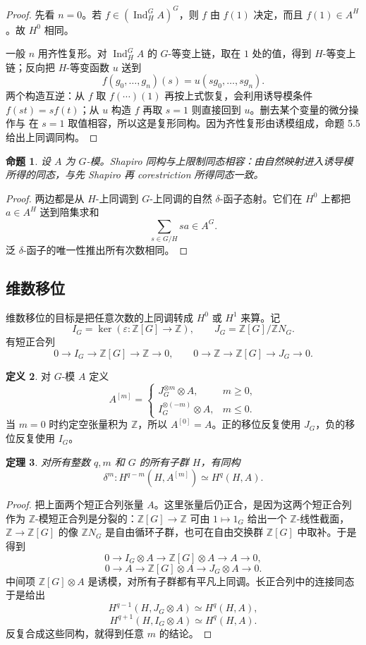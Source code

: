 \documentclass[11pt,a4paper,openany]{ctexbook}
\numberwithin{equation}{chapter}
\newcommand{\Z}{\mathbb{Z}}
\theoremstyle{plain}
\newtheorem{theorem}{定理}[chapter]
\newtheorem{proposition}[theorem]{命题}
\theoremstyle{definition}
\newtheorem{definition}[theorem]{定义}
\theoremstyle{remark}
\begin{document}
\begin{proof}
先看 $n=0$。若 $f\in(\operatorname{Ind}_H^G A)^G$，则 $f$ 由 $f(1)$ 决定，而且 $f(1)\in A^H$。故 $H^0$ 相同。

一般 $n$ 用齐性复形。对 $\operatorname{Ind}_H^G A$ 的 $G$-等变上链，取在 $1$ 处的值，得到 $H$-等变上链；反向把 $H$-等变函数 $u$ 送到
\[
 f(g_0,\ldots,g_n)(s)=u(sg_0,\ldots,sg_n).
\]
两个构造互逆：从 $f$ 取 $f(\cdots)(1)$ 再按上式恢复，会利用诱导模条件
$f(st)=sf(t)$；从 $u$ 构造 $f$ 再取 $s=1$ 则直接回到 $u$。删去某个变量的微分操作与
在 $s=1$ 取值相容，所以这是复形同构。因为齐性复形由诱模组成，命题 5.5 给出上同调同构。
\end{proof}

\begin{proposition}
设 $A$ 为 $G$-模。Shapiro 同构与上限制同态相容：由自然映射进入诱导模所得的同态，与先 Shapiro 再 corestriction 所得同态一致。
\end{proposition}

\begin{proof}
两边都是从 $H$-上同调到 $G$-上同调的自然 $\delta$-函子态射。它们在 $H^0$ 上都把 $a\in A^H$ 送到陪集求和
\[
 \sum_{s\in G/H}sa\in A^G.
\]
泛 $\delta$-函子的唯一性推出所有次数相同。
\end{proof}

\subsection{维数移位}

维数移位的目标是把任意次数的上同调转成 $H^0$ 或 $H^1$ 来算。记
\[
 I_G=\ker(\varepsilon:\Z[G]\to\Z),\qquad
 J_G=\Z[G]/\Z N_G.
\]
有短正合列
\[
 0\to I_G\to \Z[G]\to\Z\to0,
\qquad
 0\to\Z\to\Z[G]\to J_G\to0.
\]

\begin{definition}
对 $G$-模 $A$ 定义
\[
A^{[m]}=
\begin{cases}
J_G^{\otimes m}\otimes A,&m\ge0,\\
I_G^{\otimes(-m)}\otimes A,&m\le0.
\end{cases}
\]
当 $m=0$ 时约定空张量积为 $\Z$，所以 $A^{[0]}=A$。正的移位反复使用
$J_G$，负的移位反复使用 $I_G$。
\end{definition}

\begin{theorem}
对所有整数 $q,m$ 和 $G$ 的所有子群 $H$，有同构
\[
 \delta^m:H^{q-m}(H,A^{[m]})\simeq H^q(H,A).
\]
\end{theorem}

\begin{proof}
把上面两个短正合列张量 $A$。这里张量后仍正合，是因为这两个短正合列作为
$\Z$-模短正合列是分裂的：$\Z[G]\to\Z$ 可由 $1\mapsto 1_G$ 给出一个
$\Z$-线性截面，$\Z\to\Z[G]$ 的像 $\Z N_G$ 是自由循环子群，也可在自由交换群
$\Z[G]$ 中取补。于是得到
\[
 0\to I_G\otimes A\to \Z[G]\otimes A\to A\to0,
\]
\[
 0\to A\to \Z[G]\otimes A\to J_G\otimes A\to0.
\]
中间项 $\Z[G]\otimes A$ 是诱模，对所有子群都有平凡上同调。长正合列中的连接同态于是给出
\[
 H^{q-1}(H,J_G\otimes A)\simeq H^q(H,A),
\]
\[
 H^{q+1}(H,I_G\otimes A)\simeq H^q(H,A).
\]
反复合成这些同构，就得到任意 $m$ 的结论。
\end{proof}
\end{document}
